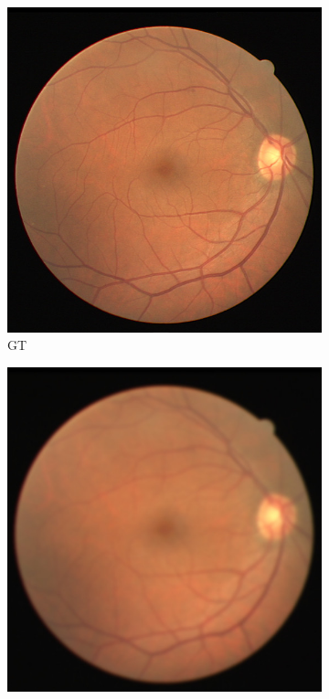 \documentclass{scrartcl}
\begin{document}
\begin{figure}[htb]
\centering
\begin{subfigure}{0.33\textwidth}
\centering
    \includegraphics[width=1.0\textwidth]{deblur_gt}
    \caption{GT}
\end{subfigure}%
\begin{subfigure}{0.33\textwidth}
\centering
    \includegraphics[width=1.0\textwidth]{deblur_lr}

\end{subfigure}
\end{figure}
\end{document}
